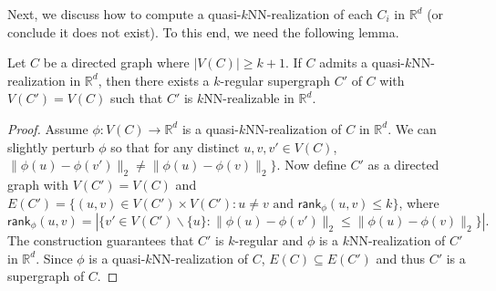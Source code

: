 Next, we discuss how to compute a quasi-$k$NN-realization of each $C_i$ in $\mathbb{R}^d$ (or conclude it does not exist).
To this end, we need the following lemma.

\begin{lemma}
Let $C$ be a directed graph where $|V(C)| \geq k+1$.
If $C$ admits a quasi-$k$NN-realization in $\mathbb{R}^d$, then there exists a $k$-regular supergraph $C'$ of $C$ with $V(C') = V(C)$ such that $C'$ is $k$NN-realizable in $\mathbb{R}^d$.
\end{lemma}
\begin{proof}
Assume $\phi: V(C) \rightarrow \mathbb{R}^d$ is a quasi-$k$NN-realization of $C$ in $\mathbb{R}^d$.
We can slightly perturb $\phi$ so that for any distinct $u,v,v' \in V(C)$, $\lVert \phi(u) - \phi(v') \rVert_2 \neq \lVert \phi(u) - \phi(v) \rVert_2\}$.
Now define $C'$ as a directed graph with $V(C') = V(C)$ and $E(C') = \{(u,v) \in V(C') \times V(C'): u \neq v \text{ and } \mathsf{rank}_\phi(u,v) \leq k\}$, where 
\begin{equation*}
    \mathsf{rank}_\phi(u,v) = |\{v' \in V(C') \backslash \{u\}: \lVert \phi(u) - \phi(v') \rVert_2 \leq \lVert \phi(u) - \phi(v) \rVert_2\}|.
\end{equation*}
The construction guarantees that $C'$ is $k$-regular and $\phi$ is a $k$NN-realization of $C'$ in $\mathbb{R}^d$.
Since $\phi$ is a quasi-$k$NN-realization of $C$, $E(C) \subseteq E(C')$ and thus $C'$ is a supergraph of $C$.
\end{proof}

